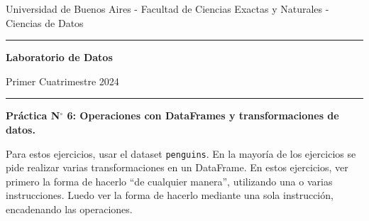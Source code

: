\documentclass[a4paper,11pt]{article}
\theoremstyle{definition}
\begin{document}
\centerline{{\small Universidad de Buenos Aires - Facultad de Ciencias Exactas y Naturales - Ciencias de Datos}}

\vskip 0.2cm

\hrule

\vskip 0.2cm

 \centerline{{\bf\Large{\sc Laboratorio de Datos}}}

 \vskip 0.2cm

 \centerline{\ttfamily Primer Cuatrimestre 2024}

\vskip 0.2cm

 \hrule

 \bigskip
 \centerline{\bf Práctica N$^\circ$ 6: Operaciones con DataFrames y transformaciones de datos.}
 \bigskip



Para estos ejercicios, usar el dataset \lstinline{penguins}. En la mayoría de los ejercicios se pide realizar varias transformaciones en un DataFrame. En estos ejercicios, ver primero la forma de hacerlo ``de cualquier manera'', utilizando una o varias instrucciones. Luedo ver la forma de hacerlo mediante una sola instrucción, encadenando las operaciones.
\end{document}

